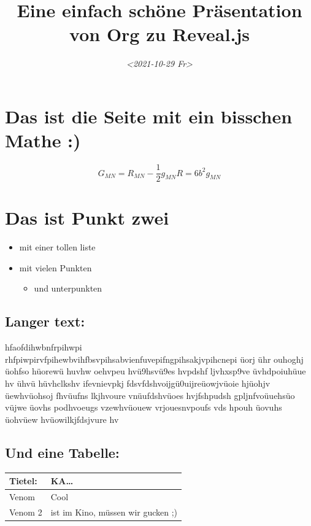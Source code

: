 \documentclass{article}
\date{\textit{<2021-10-29 Fr>}}
\title{Eine einfach schöne Präsentation\\\medskip
\large von Org zu Reveal.js}
\begin{document}
\maketitle
\setcounter{tocdepth}{1}
\tableofcontents




\section*{Das ist die Seite mit ein bisschen Mathe :)}
\label{sec:orgecccf04}
$$ G_{MN}=R_{MN}-\frac{1}{2}g_{MN}R=6b^2g_{MN} $$

\section*{Das ist Punkt zwei}
\label{sec:org02aac3c}


\begin{itemize}
\item mit einer tollen liste
\item mit vielen Punkten
\begin{itemize}
\item und unterpunkten
\end{itemize}
\end{itemize}

\subsection*{Langer text:}
\label{sec:org749eacc}
hfaofdihwbnfrpihwpi rhfpiwpirvfpihewbvihfbsvpihsabvienfuvepifngpihsakjvpihcnepi üorj ühr ouhoghj üohfso hüorewü huvhw oehvpeu hvü9hsvü9es hvpdshf ljvhxsp9ve üvhdpoiuhüue hv ühvü hüvhclkshv ifevnievpkj fdsvfdshvoijgü0uijreüowjvüoie hjüohjv üewhvüohsoj fhvüufns lkjhvoure vnüufdshvüoes hvjfshpudsh gpljnfvoüuehsüo vüjwe üovhs podhvoeugs vzewhvüouew vrjouesnvpoufs vds hpouh üovuhs üohvüew hvüowilkjfdsjvure hv
\subsection*{Und eine Tabelle:}
\label{sec:org8e2227b}
\begin{center}
\begin{tabular}{ll}
Tietel: & KA\ldots{}\\
\hline
Venom & Cool\\
Venom 2 & ist im Kino, müssen wir gucken ;)\\
\end{tabular}
\end{center}
\end{document}
